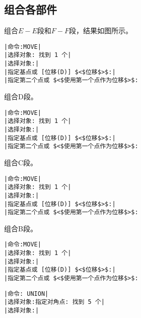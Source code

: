 \subsection{组合各部件}
\begin{procedure}
\item 组合$E-E$段和$F-F$段，结果如图所示。
\begin{lstlisting}
|命令:MOVE|
|选择对象: 找到 1 个|
|选择对象:|
|指定基点或 [位移(D)] $<$位移$>$:|
|指定第二个点或 $<$使用第一个点作为位移$>$:
\end{lstlisting}
\begin{figure}[htbp]
\centering
\begin{floatrow}[3]
\end{floatrow}
\end{figure}
\item 组合D段。
\begin{lstlisting}
|命令:MOVE|
|选择对象: 找到 1 个|
|选择对象:|
|指定基点或 [位移(D)] $<$位移$>$:|
|指定第二个点或 $<$使用第一个点作为位移$>$:
\end{lstlisting}
\item 组合C段。
\begin{lstlisting}
|命令:MOVE|
|选择对象: 找到 1 个|
|选择对象:|
|指定基点或 [位移(D)] $<$位移$>$:|
|指定第二个点或 $<$使用第一个点作为位移$>$:
\end{lstlisting}
\newpage
\item 组合B段。
\begin{lstlisting}
|命令:MOVE|
|选择对象: 找到 1 个|
|选择对象:|
|指定基点或 [位移(D)] $<$位移$>$:|
|指定第二个点或 $<$使用第一个点作为位移$>$:
\end{lstlisting}
\begin{figure}[htbp]
\centering
\begin{floatrow}[3]
\end{floatrow}
\end{figure}
\begin{lstlisting}
|命令: UNION|
|选择对象:指定对角点: 找到 5 个|
|选择对象:|
\end{lstlisting}
\end{procedure}
\endinput
